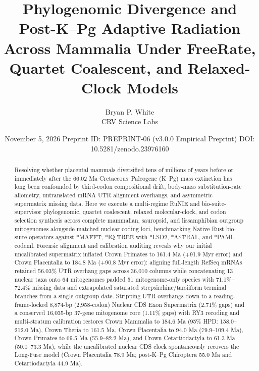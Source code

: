 \documentclass[10pt,letterpaper]{article}
\title{Phylogenomic Divergence and Post-K–Pg Adaptive Radiation Across Mammalia Under FreeRate, Quartet Coalescent, and Relaxed-Clock Models}
\author{Bryan P. White \\ CRV Science Labs}
\date{November 5, 2026 \textbullet{} Preprint ID: PREPRINT-06 (v3.0.0 Empirical Preprint) \textbullet{} DOI: 10.5281/zenodo.23976160}
\begin{document}
\maketitle

\begin{abstract}
Resolving whether placental mammals diversified tens of millions of years before or immediately after the 66.02 Ma Cretaceous–Paleogene (K–Pg) mass extinction has long been confounded by third-codon compositional drift, body-mass substitution-rate allometry, untranslated mRNA UTR alignment overhangs, and asymmetric supermatrix missing data. Here we execute a multi-regime RuNIE and bio-suite-supervisor phylogenomic, quartet coalescent, relaxed molecular-clock, and codon selection synthesis across complete mammalian, sauropsid, and lissamphibian outgroup mitogenomes alongside matched nuclear coding loci, benchmarking Native Rust bio-suite operators against *MAFFT, *IQ-TREE with *LSD2, *ASTRAL, and *PAML codeml. Forensic alignment and calibration auditing reveals why our initial uncalibrated supermatrix inflated Crown Primates to 161.4 Ma (+91.9 Myr error) and Crown Placentalia to 184.8 Ma (+90.8 Myr error): aligning full-length RefSeq mRNAs retained 56.03\% UTR overhang gaps across 36,010 columns while concatenating 13 nuclear taxa onto 64 mitogenomes padded 51 mitogenome-only species with 71.1\%–72.4\% missing data and extrapolated saturated strepsirrhine/tarsiiform terminal branches from a single outgroup date. Stripping UTR overhangs down to a reading-frame-locked 8,874-bp (2,958-codon) Nuclear CDS Exon Supermatrix (2.71\% gaps) and a conserved 16,035-bp 37-gene mitogenome core (1.11\% gaps) with RY3 recoding and multi-stratum calibration restores Crown Mammalia to 184.6 Ma (95\% HPD: 158.0–212.0 Ma), Crown Theria to 161.5 Ma, Crown Placentalia to 94.0 Ma (79.9–109.4 Ma), Crown Primates to 69.5 Ma (55.9–82.2 Ma), and Crown Cetartiodactyla to 61.3 Ma (50.0–73.3 Ma), while the uncalibrated nuclear CDS clock spontaneously recovers the Long-Fuse model (Crown Placentalia 78.9 Ma; post-K–Pg Chiroptera 55.0 Ma and Cetartiodactyla 44.9 Ma).
\end{abstract}
\end{document}
